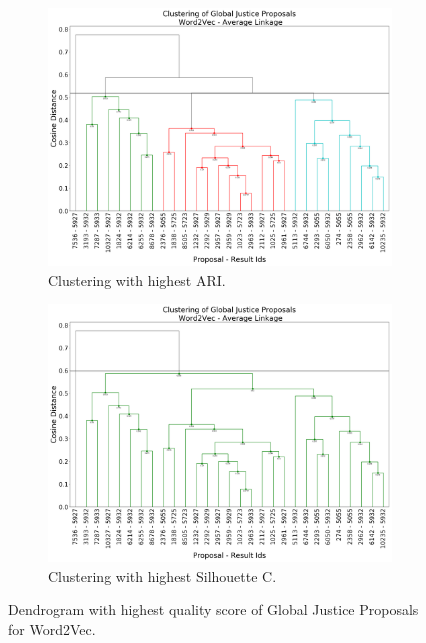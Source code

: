 \begin{figure}[!htpb]
  \centering
  \begin{subfigure}[b]{0.60\textwidth}   
  \centering 
  \includegraphics[width=\textwidth]{word2vec/BEST_ARI_Global_Justice.png}
  \caption[]%
  {{\small Clustering with highest ARI.}}    
  \label{fig:gj.word2vec.ari}
  \end{subfigure}
  \quad
  \begin{subfigure}[b]{0.60\textwidth}   
  \centering 
  \includegraphics[width=\textwidth]{word2vec/BEST_SIL_Global_Justice.png}
  \caption[]%
  {{\small Clustering with highest Silhouette C.}}    
  \label{fig:gj.word2vec.sil}
  \end{subfigure}
\caption{Dendrogram with highest quality score of Global Justice Proposals for Word2Vec.}
\label{fig:gj.word2vec.dendro}
\end{figure}
    

\FloatBarrier

\newpage
